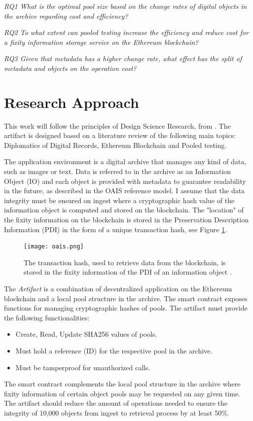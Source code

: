 \textit{RQ1 What is the optimal pool size based on the change rates of digital objects in the archive regarding cost and efficiency?}

\textit{RQ2 To what extent can pooled testing increase the efficiency and reduce cost for a fixity information storage service on the Ethereum blockchain?}

\textit{RQ3 Given that metadata has a higher change rate, what effect has the split of metadata and objects on the operation cost?}

\section{Research Approach}
\label{sec:approach}
This work will follow the principles of Design Science Research, from \cite{hevner2007three}. The artifact is designed based on a literature review of the following main topics: Diplomatics of Digital Records, Ethereum Blockchain and Pooled testing.

The application environment is a digital archive that manages any kind of data, such as images or text. Data is referred to in the archive as an Information Object (IO) and each object is provided with metadata to guarantee readability in the future, as described in the OAIS reference model. I assume that the data integrity must be ensured on ingest where a cryptographic hash value of the information object is computed and stored on the blockchain. The "location" of the fixity information on the blockchain is stored in the Preservation Description Information (PDI) in the form of a unique transaction hash, see Figure \ref{fig:oais-fixity}. 

\begin{figure}[t]
  \centering
  \texttt{[image: oais.png]}
  \caption{The transaction hash, used to retrieve data from the blockchain, is stored in the fixity information of the PDI of an information object \cite[7]{lee2010open}.}
  \label{fig:oais-fixity}
\end{figure}

The \textit{Artifact} is a combination of decentralized application on the Ethereum blockchain and a local pool structure in the archive. The smart contract exposes functions for managing cryptographic hashes of pools.
The artifact must provide the following functionalities:
\begin{itemize}
  \item Create, Read, Update SHA256 values of pools.
  \item Must hold a reference (ID) for the respective pool in the archive.
  \item Must be tamperproof for unauthorized calls.
\end{itemize}
The smart contract complements the local pool structure in the archive where fixity information of certain object pools may be requested on any given time. The artifact should reduce the amount of operations needed to ensure the integrity of 10,000 objects from ingest to retrieval process by at least 50\%.

